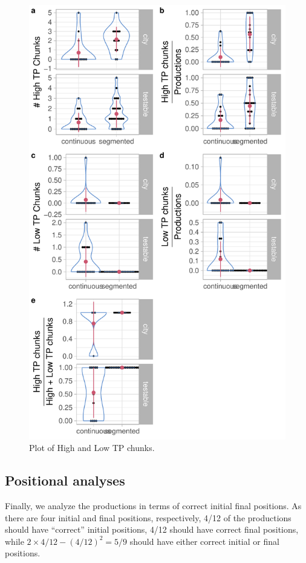 \documentclass[]{article}
\begin{document}
\begin{figure}

{\centering \includegraphics[width=0.8\linewidth]{segmentation_recall_combined_files/figure-latex/recall-tp-chunks-plot-1} 

}

\caption{Plot of High and Low TP chunks.}\label{fig:recall-tp-chunks-plot}
\end{figure}

\subsection{Positional analyses}\label{positional-analyses}

Finally, we analyze the productions in terms of correct initial final
positions. As there are four initial and final positions, respectively,
4/12 of the productions should have ``correct'' initial positions, 4/12
should have correct final positions, while
\(2 \times 4/12 - (4/12)^2 = 5/9\) should have either correct initial or
final positions.
\end{document}

